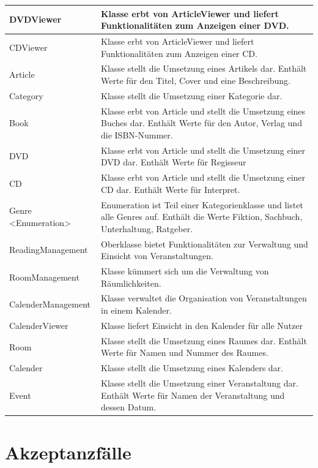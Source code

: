 \documentclass[a4paper]{article}
\begin{document}
\begin{longtable}{|p{100px}|p{250px}|}
	DVDViewer & Klasse erbt von ArticleViewer und liefert Funktionalitäten zum Anzeigen einer DVD. \\ \hline
	CDViewer & Klasse erbt von ArticleViewer und liefert Funktionalitäten zum Anzeigen einer CD. \\ \hline
	Article & Klasse stellt die Umsetzung eines Artikels dar. Enthält Werte für den Titel, Cover und eine Beschreibung. \\ \hline
	Category & Klasse stellt die Umsetzung einer Kategorie dar. \\ \hline
	Book & Klasse erbt von Article und stellt die Umsetzung eines Buches dar. Enthält Werte für den Autor, Verlag und die ISBN-Nummer. \\ \hline
	DVD & Klasse erbt von Article und stellt die Umsetzung einer DVD dar. Enthält Werte für Regisseur \\ \hline
	CD & Klasse erbt von Article und stellt die Umsetzung einer CD dar. Enthält Werte für Interpret. \\ \hline
	Genre <Enumeration> & Enumeration ist Teil einer Kategorienklasse und listet alle Genres auf. Enthält die Werte Fiktion, Sachbuch, Unterhaltung, Ratgeber. \\ \hline
	ReadingManagement & Oberklasse bietet Funktionalitäten zur Verwaltung und Einsicht von Veranstaltungen. \\ \hline
	RoomManagement & Klasse kümmert sich um die Verwaltung von Räumlichkeiten. \\ \hline
	CalenderManagement & Klasse verwaltet die Organisation von Veranstaltungen in einem Kalender. \\ \hline
	CalenderViewer & Klasse liefert Einsicht in den Kalender für alle Nutzer \\ \hline
	Room & Klasse stellt die Umsetzung eines Raumes dar. Enthält Werte für Namen und Nummer des Raumes. \\ \hline
	Calender & Klasse stellt die Umsetzung eines Kalenders dar. \\ \hline
	Event & Klasse stellt die Umsetzung einer Veranstaltung dar. Enthält Werte für Namen der Veranstaltung und dessen Datum. \\ \hline
\end{longtable}


\section{Akzeptanzfälle}
\end{document}

